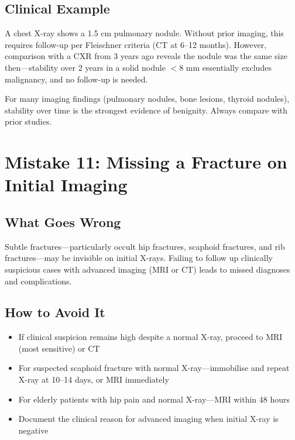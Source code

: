\subsection{Clinical Example}
A chest X-ray shows a 1.5 cm pulmonary nodule. Without prior imaging, this requires follow-up per Fleischner criteria (CT at 6--12 months). However, comparison with a CXR from 3 years ago reveals the nodule was the same size then---stability over 2 years in a solid nodule $<8$ mm essentially excludes malignancy, and no follow-up is needed.

\begin{pearlbox}
For many imaging findings (pulmonary nodules, bone lesions, thyroid nodules), stability over time is the strongest evidence of benignity. Always compare with prior studies.
\end{pearlbox}

\clearpage

\section{Mistake 11: Missing a Fracture on Initial Imaging}

\subsection{What Goes Wrong}
Subtle fractures---particularly occult hip fractures, scaphoid fractures, and rib fractures---may be invisible on initial X-rays. Failing to follow up clinically suspicious cases with advanced imaging (MRI or CT) leads to missed diagnoses and complications.

\subsection{How to Avoid It}
\begin{itemize}
    \item If clinical suspicion remains high despite a normal X-ray, proceed to MRI (most sensitive) or CT
    \item For suspected scaphoid fracture with normal X-ray---immobilise and repeat X-ray at 10--14 days, or MRI immediately
    \item For elderly patients with hip pain and normal X-ray---MRI within 48 hours
    \item Document the clinical reason for advanced imaging when initial X-ray is negative
\end{itemize}

